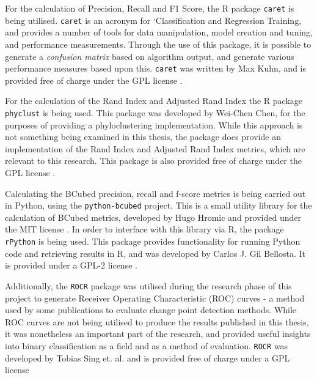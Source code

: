 \documentclass{uvamscse}	%
\begin{document}

For the calculation of Precision, Recall and F1 Score, the \textsf{R} package \texttt{caret} is being utilised. \texttt{caret} is an acronym for `Classification and Regression Training, and provides a number of tools for data manipulation, model creation and tuning, and performance measurements. Through the use of this package, it is possible to generate a \emph{confusion matrix} based on algorithm output, and generate various performance measures based upon this. \texttt{caret} was written by Max Kuhn, and is provided free of charge under the GPL license \cite{FromJedWing2017}.

For the calculation of the Rand Index and Adjusted Rand Index the \textsf{R} package \texttt{phyclust} is being used. This package was developed by Wei-Chen Chen, for the purposes of providing a phyloclustering implementation. While this approach is not something being examined in this thesis, the package does provide an implementation of the Rand Index and Adjusted Rand Index metrics, which are relevant to this research. This package is also provided free of charge under the GPL license \cite{Chen2011}.

Calculating the BCubed precision, recall and f-score metrics is being carried out in Python, using the \texttt{python-bcubed} project. This is a small utility library for the calculation of BCubed metrics, developed by Hugo Hromic and provided under the MIT license \cite{Hromic2016}. In order to interface with this library via \textsf{R}, the package \texttt{rPython} is being used. This package provides functionality for running Python code and retrieving results in \textsf{R}, and was developed by Carlos J. Gil Bellosta. It is provided under a GPL-2 license \cite{Bellosta2015}.

Additionally, the \texttt{ROCR} package was utilised during the research phase of this project to generate Receiver Operating Characteristic (ROC) curves - a method used by some publications to evaluate change point detection methods. While ROC curves are not being utilised to produce the results published in this thesis, it was nonetheless an important part of the research, and provided useful insights into binary classification as a field and as a method of evaluation. \texttt{ROCR} was developed by Tobias Sing et. al. and is provided free of charge under a GPL license \cite{Sing2005}
\end{document}
